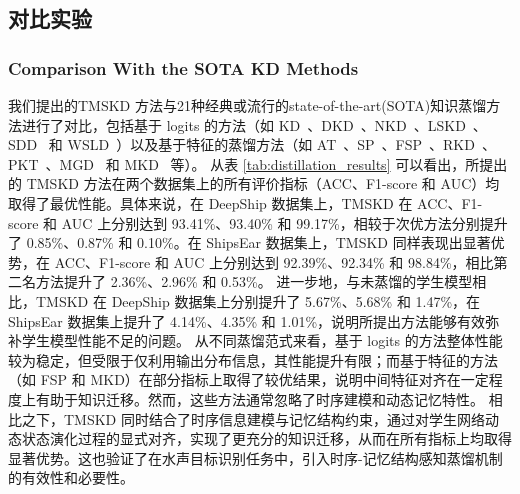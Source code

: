 \documentclass[a4paper, 12pt]{article}
\begin{document}
\subsection{对比实验}
\subsubsection{Comparison With the SOTA KD Methods}

我们提出的TMSKD 方法与21种经典或流行的state-of-the-art(SOTA)知识蒸馏方法进行了对比，包括基于 logits 的方法（如 KD~\cite{Hinton2015Distilling}、DKD~\cite{Zhao2022DKD}、NKD~\cite{Yang2023NKD}、LSKD~\cite{Sun2024LSKD}、SDD~\cite{Wei2024SDD} 和 WSLD~\cite{Zhou2021WSLD}）以及基于特征的蒸馏方法（如 AT~\cite{Zagoruyko2017AT}、SP~\cite{Tung2019SP}、FSP~\cite{Yim2017FSP}、RKD~\cite{Park2019RKD}、PKT~\cite{Passalis2018PKT}、MGD~\cite{Yang2022MGD} 和 MKD~\cite{Lao2023MKD} 等）。
从表 \ref{tab:distillation_results} 可以看出，所提出的 TMSKD 方法在两个数据集上的所有评价指标（ACC、F1-score 和 AUC）均取得了最优性能。具体来说，在 DeepShip 数据集上，TMSKD 在 ACC、F1-score 和 AUC 上分别达到 93.41\%、93.40\% 和 99.17\%，相较于次优方法分别提升了 0.85\%、0.87\% 和 0.10\%。在 ShipsEar 数据集上，TMSKD 同样表现出显著优势，在 ACC、F1-score 和 AUC 上分别达到 92.39\%、92.34\% 和 98.84\%，相比第二名方法提升了 2.36\%、2.96\% 和 0.53\%。
进一步地，与未蒸馏的学生模型相比，TMSKD 在 DeepShip 数据集上分别提升了 5.67\%、5.68\% 和 1.47\%，在 ShipsEar 数据集上提升了 4.14\%、4.35\% 和 1.01\%，说明所提出方法能够有效弥补学生模型性能不足的问题。
从不同蒸馏范式来看，基于 logits 的方法整体性能较为稳定，但受限于仅利用输出分布信息，其性能提升有限；而基于特征的方法（如 FSP 和 MKD）在部分指标上取得了较优结果，说明中间特征对齐在一定程度上有助于知识迁移。然而，这些方法通常忽略了时序建模和动态记忆特性。
相比之下，TMSKD 同时结合了时序信息建模与记忆结构约束，通过对学生网络动态状态演化过程的显式对齐，实现了更充分的知识迁移，从而在所有指标上均取得显著优势。这也验证了在水声目标识别任务中，引入时序-记忆结构感知蒸馏机制的有效性和必要性。
\end{document}
